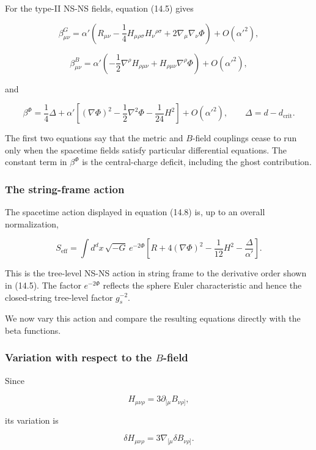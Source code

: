 \documentclass[
  10pt,
  a4paper,
  openany]{book}
\begin{document}
For the type-II NS-NS fields, equation (14.5) gives

\[
\beta^G_{\mu\nu}
=\alpha'
\left(
R_{\mu\nu}
-\frac14H_{\mu\rho\sigma}H_\nu{}^{\rho\sigma}
+2\nabla_\mu\nabla_\nu\Phi
\right)
+O(\alpha'^2),
\]

\[
\beta^B_{\mu\nu}
=\alpha'
\left(
-\frac12\nabla^\rho H_{\rho\mu\nu}
+H_{\rho\mu\nu}\nabla^\rho\Phi
\right)
+O(\alpha'^2),
\]

and

\[
\beta^\Phi
=\frac14\Delta
+\alpha'
\left[
(\nabla\Phi)^2
-\frac12\nabla^2\Phi
-\frac1{24}H^2
\right]
+O(\alpha'^2),
\qquad
\Delta=d-d_{\mathrm{crit}}.
\]

The first two equations say that the metric and \(B\)-field couplings
cease to run only when the spacetime fields satisfy particular
differential equations. The constant term in \(\beta^\Phi\) is the
central-charge deficit, including the ghost contribution.

\subsubsection{The string-frame action}\label{the-string-frame-action}

The spacetime action displayed in equation (14.8) is, up to an overall
normalization,

\[
\boxed{
S_{\mathrm{eff}}
=
\int d^dx\,\sqrt{-G}\,e^{-2\Phi}
\left[
R
+4(\nabla\Phi)^2
-\frac1{12}H^2
-\frac{\Delta}{\alpha'}
\right].
}
\]

This is the tree-level NS-NS action in string frame to the derivative
order shown in (14.5). The factor \(e^{-2\Phi}\) reflects the sphere
Euler characteristic and hence the closed-string tree-level factor
\(g_s^{-2}\).

We now vary this action and compare the resulting equations directly
with the beta functions.

\subsubsection{\texorpdfstring{Variation with respect to the
\(B\)-field}{Variation with respect to the B-field}}\label{variation-with-respect-to-the-b-field}

Since

\[
H_{\mu\nu\rho}=3\partial_{[\mu}B_{\nu\rho]},
\]

its variation is

\[
\delta H_{\mu\nu\rho}
=3\nabla_{[\mu}\delta B_{\nu\rho]}.
\]
\end{document}
